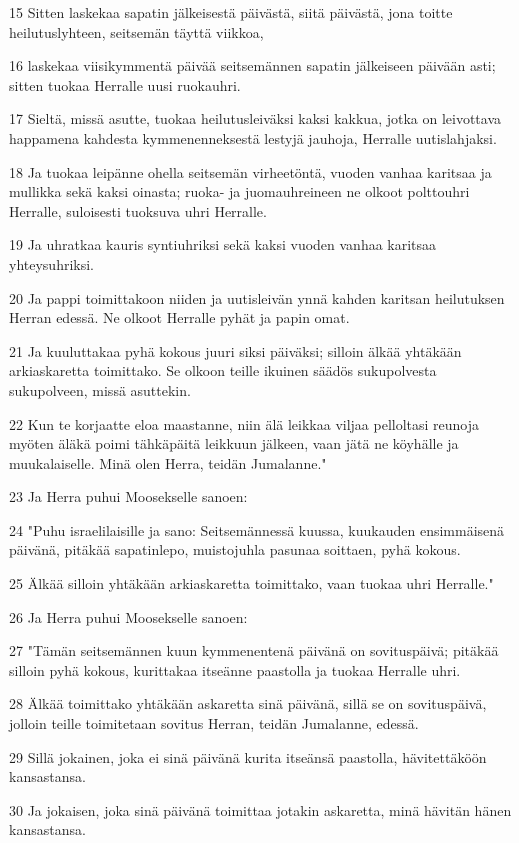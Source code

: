 \par 15 Sitten laskekaa sapatin jälkeisestä päivästä, siitä päivästä, jona toitte heilutuslyhteen, seitsemän täyttä viikkoa,
\par 16 laskekaa viisikymmentä päivää seitsemännen sapatin jälkeiseen päivään asti; sitten tuokaa Herralle uusi ruokauhri.
\par 17 Sieltä, missä asutte, tuokaa heilutusleiväksi kaksi kakkua, jotka on leivottava happamena kahdesta kymmenenneksestä lestyjä jauhoja, Herralle uutislahjaksi.
\par 18 Ja tuokaa leipänne ohella seitsemän virheetöntä, vuoden vanhaa karitsaa ja mullikka sekä kaksi oinasta; ruoka- ja juomauhreineen ne olkoot polttouhri Herralle, suloisesti tuoksuva uhri Herralle.
\par 19 Ja uhratkaa kauris syntiuhriksi sekä kaksi vuoden vanhaa karitsaa yhteysuhriksi.
\par 20 Ja pappi toimittakoon niiden ja uutisleivän ynnä kahden karitsan heilutuksen Herran edessä. Ne olkoot Herralle pyhät ja papin omat.
\par 21 Ja kuuluttakaa pyhä kokous juuri siksi päiväksi; silloin älkää yhtäkään arkiaskaretta toimittako. Se olkoon teille ikuinen säädös sukupolvesta sukupolveen, missä asuttekin.
\par 22 Kun te korjaatte eloa maastanne, niin älä leikkaa viljaa pelloltasi reunoja myöten äläkä poimi tähkäpäitä leikkuun jälkeen, vaan jätä ne köyhälle ja muukalaiselle. Minä olen Herra, teidän Jumalanne."
\par 23 Ja Herra puhui Moosekselle sanoen:
\par 24 "Puhu israelilaisille ja sano: Seitsemännessä kuussa, kuukauden ensimmäisenä päivänä, pitäkää sapatinlepo, muistojuhla pasunaa soittaen, pyhä kokous.
\par 25 Älkää silloin yhtäkään arkiaskaretta toimittako, vaan tuokaa uhri Herralle."
\par 26 Ja Herra puhui Moosekselle sanoen:
\par 27 "Tämän seitsemännen kuun kymmenentenä päivänä on sovituspäivä; pitäkää silloin pyhä kokous, kurittakaa itseänne paastolla ja tuokaa Herralle uhri.
\par 28 Älkää toimittako yhtäkään askaretta sinä päivänä, sillä se on sovituspäivä, jolloin teille toimitetaan sovitus Herran, teidän Jumalanne, edessä.
\par 29 Sillä jokainen, joka ei sinä päivänä kurita itseänsä paastolla, hävitettäköön kansastansa.
\par 30 Ja jokaisen, joka sinä päivänä toimittaa jotakin askaretta, minä hävitän hänen kansastansa.
